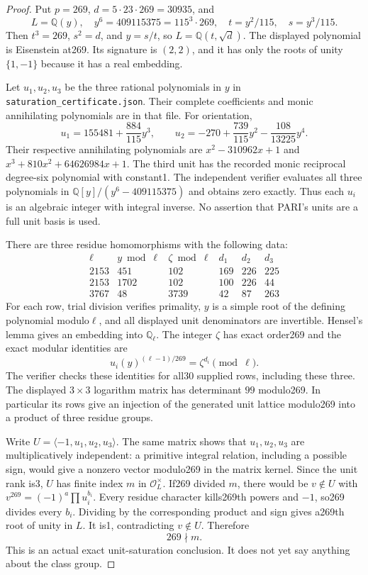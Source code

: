 \begin{proof}
Put $p=269$, $d=5\cdot23\cdot269=30935$, and
\[
 L=\mathbb Q(y),\quad y^6=409115375=115^3\cdot269,
 \quad t=y^2/115,\quad s=y^3/115.
\]
Then $t^3=269$, $s^2=d$, and
$y=s/t$, so $L=\mathbb Q(t,\sqrt d)$.
The displayed polynomial is Eisenstein at269.  Its signature is $(2,2)$,
and it has only the roots of unity $\{1,-1\}$ because it has a real embedding.

Let $u_1,u_2,u_3$ be the three rational polynomials in $y$ in
\texttt{saturation\_certificate.json}.  Their complete coefficients and
monic annihilating polynomials are in that file.  For orientation,
\[
 u_1=155481+\frac{884}{115}y^3,
 \qquad
 u_2=-270+\frac{739}{115}y^2-\frac{108}{13225}y^4.
\]
Their respective annihilating polynomials are
$x^2-310962x+1$ and $x^3+810x^2+64626984x+1$.
The third unit has the recorded monic reciprocal degree-six polynomial
with constant1.  The independent verifier evaluates all three polynomials
in $\mathbb Q[y]/(y^6-409115375)$ and obtains zero exactly.
Thus each $u_i$ is an algebraic integer with integral inverse.
No assertion that PARI's units are a full unit basis is used.

There are three residue homomorphisms with the following data:
\[
\begin{array}{c|c|c|ccc}
\ell&y\bmod\ell&\zeta\bmod\ell&d_1&d_2&d_3\\\hline
2153&451&102&169&226&225\\
2153&1702&102&100&226&44\\
3767&48&3739&42&87&263
\end{array}
\]
For each row, trial division verifies primality, $y$ is a simple root of
the defining polynomial modulo$\ell$, and all displayed unit denominators
are invertible.  Hensel's lemma gives an embedding into $\mathbb Q_\ell$.
The integer $\zeta$ has exact order269 and the exact modular identities are
\[
        u_i(y)^{(\ell-1)/269}=\zeta^{d_i}\pmod\ell.
\]
The verifier checks these identities for all30 supplied rows, including
these three.  The displayed $3\times3$ logarithm matrix has determinant
$99$ modulo269.  In particular its rows give an injection of the generated
unit lattice modulo269 into a product of three residue groups.

Write $U=\langle-1,u_1,u_2,u_3\rangle$.
The same matrix shows that $u_1,u_2,u_3$ are multiplicatively independent:
a primitive integral relation, including a possible sign, would give a
nonzero vector modulo269 in the matrix kernel.  Since the unit rank is3,
$U$ has finite index $m$ in $\mathcal O_L^\times$.
If269 divided $m$, there would be $v\notin U$ with
$v^{269}=(-1)^a\prod u_i^{b_i}$.
Every residue character kills269th powers and $-1$, so269 divides every
$b_i$.  Dividing by the corresponding product and sign gives a269th root
of unity in $L$.  It is1, contradicting $v\notin U$.  Therefore
\[
                     269\nmid m.
\]
This is an actual exact unit-saturation conclusion.  It does not yet say
anything about the class group.


\end{proof}
